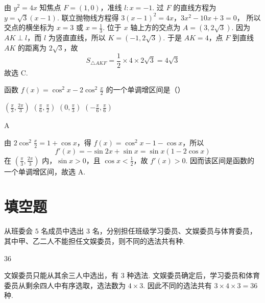 \begin{solution}
由 \(y^2=4x\) 知焦点 \(F=(1,0)\)，准线 \(l:x=-1\). 过 \(F\) 的直线方程为 \(y=\sqrt3(x-1)\). 联立抛物线方程得
\(3(x-1)^2=4x\)，\(3x^2-10x+3=0\)，
所以交点的横坐标为 \(x=3\) 或 \(x=\frac13\). 位于 \(x\) 轴上方的交点为 \(A=(3,2\sqrt3)\). 因为 \(AK\perp l\)，而 \(l\) 为竖直直线，所以 \(K=(-1,2\sqrt3)\). 于是 \(AK=4\)，点 \(F\) 到直线 \(AK\) 的距离为 \(2\sqrt3\)，故
\[
S_{\triangle AKF}=\frac12\times4\times2\sqrt3=4\sqrt3
\]
故选 C.
\end{solution}

\begin{problem}
函数 \(f(x) = \cos^{2} x - 2\cos^{2} \frac{x}{2}\) 的一个单调增区间是（\quad）

\choices
    {\( \left(\frac{\pi}{3},\frac{2\pi}{3}\right) \)}
    {\( \left(\frac{\pi}{6},\frac{\pi}{2}\right) \)}
    {\(\left(0,\frac{\pi}{3}\right)\)}
    {\(\left(-\frac{\pi}{6},\frac{\pi}{6}\right)\)}
\end{problem}

\begin{answer}
A
\end{answer}

\begin{solution}
由 \(2\cos^2\frac{x}{2}=1+\cos x\)，得 \(f(x)=\cos^2x-1-\cos x\)，所以
\[
f'(x)=-\sin2x+\sin x=\sin x(1-2\cos x)
\]
在 \(\left(\frac\pi3,\frac{2\pi}3\right)\) 内，\(\sin x>0\)，且 \(\cos x<\frac12\)，故 \(f'(x)>0\). 因而该区间是函数的一个单调增区间，故选 A.
\end{solution}

\section{填空题}

\begin{problem}
从班委会 \(5\) 名成员中选出 \(3\) 名，分别担任班级学习委员、文娱委员与体育委员，其中甲、乙二人不能担任文娱委员，则不同的选法共有\fillinblank{}种.
\end{problem}

\begin{answer}
36
\end{answer}

\begin{solution}
文娱委员只能从其余三人中选出，有 \(3\) 种选法. 文娱委员确定后，学习委员和体育委员从剩余四人中有序选取，选法数为 \(4\times3\). 因此不同的选法共有 \(3\times4\times3=36\) 种.
\end{solution}

